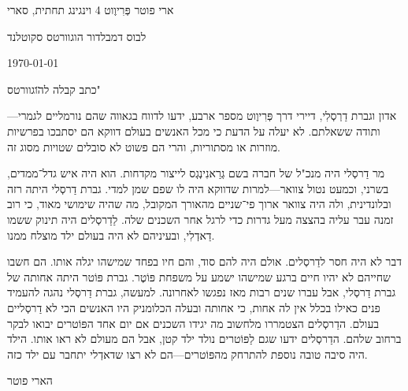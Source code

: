 \useOpTeX

\def\נושא{\subject}
\helang   %
\fontfam[culmus]


\hfill\address
 הארי פוטר
 פְּרִיוֶוט 4 
וינגינג תחתית, סארי

\bigskip

\address
  אלבוס דמבלדור
  הוגוורטס
  סקוטלנד

\hfill\today

\נושא מכתב קבלה ל\"הוגוורטס"

 אדון וגברת דַרְסְלִי, דיירי דרך פְּרִיוֶוט מספר ארבע, ידעו לדווח בגאווה שהם נורמליים לגמרי---ותודה ששאלתם. לא יעלה על הדעת כי מכל האנשים בעולם דווקא הם יסתבכו בפרשיות מוזרות או מסתוריות, והרי הם פשוט לא סובלים שטויות מסוג זה.

מר דַרסְלי היה מנכ"ל של חברה בשם גְרַאנִינְגְס לייצור מקדחות. הוא היה איש גדל־ממדים, בשרני, וכמעט נטול צוואר---למרות שדווקא היה לו שפם שמן למדי. גברת דַרסְלי היתה רזה ובלונדינית, ולה היה צוואר ארוך פי־שניים מהאורך המקובל, מה שהיה שימושי מאוד, כי רוב זמנה עבר עליה בהצצה מעל גדרות כדי לרגל אחר השכנים שלה. לַדַרסְלים היה תינוק ששמו דַאדְלִי, ובעיניהם לא היה בעולם ילד מוצלח ממנו.

דבר לא היה חסר לדַרסְלים. אולם היה להם סוד, והם חיו בפחד שמישהו יגלה אותו. הם חשבו שחייהם לא יהיו חיים ברגע שמישהו ישמע על משפחת פּוֹטֶר. גברת פּוֹטר היתה אחותה של גברת דַרסְלי, אבל עברו שנים רבות מאז נפגשו לאחרונה. למעשה, גברת דַרסְלי נהגה להעמיד פנים כאילו בכלל אין לה אחות, כי אחותה ובעלה הכלומניק היו האנשים הכי לא דַרסְליים בעולם. הדַרסְלים הצטמררו מלחשוב מה יגידו השכנים אם יום אחד הפּוֹטרים יבואו לבקר ברחוב שלהם. הדַרסְלים ידעו שגם לַפּוֹטרים נולד ילד קטן, אבל הם מעולם לא ראו אותו. הילד היה סיבה טובה נוספת להתרחק מהפּוֹטרים---הם לא רצו שדאדְלי יתחבר עם ילד כזה.
\bigskip %
\bigskip

הארי פוטר
\bye
